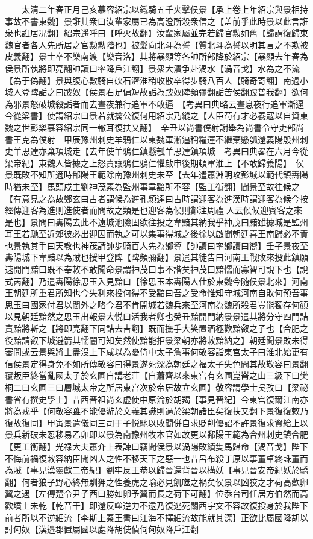 　　太清二年春正月己亥慕容紹宗以鐵騎五千夹擊侯景【承上卷上年紹宗與景相持事故不書東魏】景誑其衆曰汝輩家屬已為高澄所殺衆信之【盖前乎此時景以此言誑衆也誑居况翻】紹宗遥呼曰【呼火故翻】汝輩家屬並完若歸官勲如舊【歸謂復歸東魏官者各人先所居之官勲勲階也】被髮向北斗為誓【質北斗為誓以明其言之不欺被皮義翻】景士卒不樂南渡【樂音洛】其將暴顯等各帥所部降於紹宗【暴顯去年春為侯景所執將即亮翻帥讀曰率降戶江翻】景衆大潰争赴渦水【渦音戈】水為之不流【為于偽翻】景與腹心數騎自硖石濟淮稍收散卒得步騎八百人【騎奇寄翻】南過小城人登陴詬之曰跛奴【侯景右足偏短故詬為跛奴陴頻彌翻詬苦侯翻跛普我翻】欲何為邪景怒破城殺詬者而去晝夜兼行追軍不敢逼　【考異曰典略云晝息夜行追軍漸逼今從梁書】使謂紹宗曰景若就擒公復何用紹宗乃縱之【人臣苟有才必養寇以自資東魏之世彭樂慕容紹宗同一轍耳復扶又翻】　辛丑以尚書僕射謝舉為尚書令守吏部尚書王克為僕射　甲辰豫州刺史羊鴉仁以東魏軍漸逼稱糧運不繼棄懸瓠還義陽殷州刺史羊思達亦棄項城走【去年使羊鴉仁鎮懸瓠羊思達鎮項城　考異曰典畧在六月今從梁帝紀】東魏人皆據之上怒責讓鴉仁鴉仁懼啟申後期頓軍淮上【不敢歸義陽】　侯景既敗不知所適時鄱陽王範除南豫州刺史未至【去年遣蕭淵明攻彭城以範代鎮夀陽時猶未至】馬頭戍主劉神茂素為監州事韋黯所不容【監工衘翻】聞景至故往候之【有意見之為故鄭玄曰古者謂候為進孔穎達曰古時謂迎客為進漢時謂迎客為候今按經傳迎客為進則進使者而問故之類是也迎客為候則鄭注周禮人云候候迎賓客之來是也】景問曰夀陽去此不遠城池險固欲往投之韋黯其納我乎神茂曰黯雖據城是監州耳王若馳至近郊彼必出迎因而執之可以集事得城之後徐以啟聞朝廷喜王南歸必不責也景執其手曰天教也神茂請帥步騎百人先為鄉導【帥讀曰率鄉讀曰嚮】壬子景夜至夀陽城下韋黯以為賊也授甲登陴【陴頻彌翻】景遣其徒告曰河南王戰敗來投此鎮願速開門黯曰既不奉敇不敢聞命景謂神茂曰事不諧矣神茂曰黯懦而寡智可說下也【說式芮翻】乃遣夀陽徐思玉入見黯曰【徐思玉本夀陽人仕於東魏今随侯景北來】河南王朝廷所重君所知也今失利來投何得不受黯曰吾之受命惟知守城河南自敗何預吾事思玉曰國家付君以閫外之略今君不肯開城若魏兵來至河南為魏所殺君豈能獨存何顔以見朝廷黯然之思玉出報景大悦曰活我者卿也癸丑黯開門納景景遣其將分守四門詰責黯將斬之【將即亮翻下同詰去吉翻】既而撫手大笑置酒極歡黯叡之子也【合肥之役黯請叡下城避箭其懦闇可知矣然使黯能拒景梁朝亦將敇黯納之】朝廷聞景敗未得審問或云景與將士盡沒上下咸以為憂侍中太子詹事何敬容詣東宫太子曰淮北始更有信侯景定得身免不如所傳敬容曰得景遂死深為朝廷之福太子失色問其故敬容曰景翻覆叛臣終當亂國太子於玄圃自講老莊【自蕭齊以來東宫有玄圃崑崙之山三級下曰樊桐二曰玄圃三曰層城太帝之所居東宫次於帝居故立玄圃】敬容謂學士吳孜曰【梁祕書省有撰史學士】昔西晉祖尚玄虚使中原淪於胡羯【事見晉紀】今東宫復爾江南亦將為戎乎【何敬容雖不能優游於文義其識則過於梁朝諸臣矣復扶又翻下景復復敕乃復故復同】甲寅景遣儀同三司于子悦馳以敗聞併自求貶削優詔不許景復求資給上以景兵新破未忍移易乙卯即以景為南豫州牧本官如故更以鄱陽王範為合州刺史鎮合肥【更工衡翻】光禄大夫蕭介上表諫曰竊聞侯景以渦陽敗績隻馬歸命【渦音戈】陛下不悔前禍復敇容納臣聞凶人之性不移天下之惡一也昔呂布殺丁原以事董卓終誅董而為賊【事見漢靈獻二帝紀】劉牢反王恭以歸晉還背晉以構妖【事見晉安帝紀妖於驕翻】何者狼子野心終無馴狎之性養虎之喻必見飢噬之禍矣侯景以凶狡之才荷高歡卵翼之遇【左傳楚令尹子西曰勝如卵予翼而長之荷下可翻】位忝台司任居方伯然而高歡墳土未乾【乾音干】即還反噬逆力不逮乃復逃死關西宇文不容故復投身於我陛下前者所以不逆細流【李斯上秦王書曰江海不擇細流故能就其深】正欲比屬國降胡以討匈奴【漢邉郡置屬國以處降胡使偵伺匈奴降戶江翻